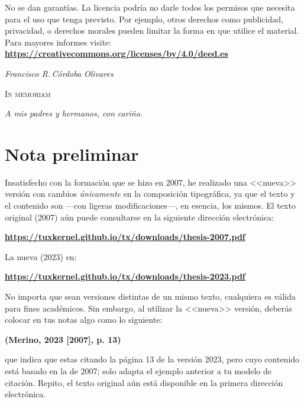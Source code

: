 \documentclass[14pt,twoside,final]{extbook} %
\begin{document}
\begin{scriptsize}
\begin{flushleft}
\begin{minipage}{7.5cm}
\noindent No se dan garantías. La licencia podría no darle todos los permisos que necesita para el uso que tenga previsto. Por ejemplo, otros derechos como publicidad, privacidad, o derechos morales pueden limitar la forma en que utilice el material. \\

\noindent Para mayores informes visite: \\ 

\textbf{\url{https://creativecommons.org/licenses/by/4.0/deed.es}}
\end{minipage}
\end{flushleft}
\end{scriptsize}
\newpage
\pagestyle{empty}
\vspace*{42pt}
\begin{flushright}
\textit{Francisco R.\,Córdoba Olivares}
\end{flushright}
\begin{flushright}
\textsc{In memoriam}
\vspace*{28pt}
\end{flushright}
\begin{flushright}
\textit{A mis padres y hermanos, con cariño.}
\end{flushright}
\newpage
\pagestyle{empty}
\newpage
\pagestyle{empty}
\chapter*{Nota preliminar}\label{ch:nota-preliminar}
Insatisfecho con la formación que se hizo en 2007, he realizado una <<nueva>> versión con cambios \emph{únicamente} en la composición tipográfica, ya que el texto y el contenido son ---con ligeras modificaciones---, en esencia, los mismos. El texto original (2007) aún puede consultarse en la siguiente dirección electrónica:
\begin{center}
\href{https://tuxkernel.github.io/tx/downloads/thesis-2007.pdf}{\bfseries https://tuxkernel.github.io/tx/downloads/thesis-2007.pdf}
\end{center}
La nueva (2023) en:
\begin{center}
\href{https://tuxkernel.github.io/tx/downloads/thesis-2023.pdf}{\bfseries https://tuxkernel.github.io/tx/downloads/thesis-2023.pdf}
\end{center}
No importa que sean versiones distintas de un mismo texto, cualquiera es válida para fines académicos. Sin embargo, al utilizar la <<nueva>> versión, deberás colocar en tus notas algo como lo siguiente:
\begin{center}
\bfseries (Merino, 2023 [2007], p. 13)
\end{center}
\noindent que indica que estas citando la página 13 de la versión 2023, pero cuyo contenido está basado en la de 2007; solo adapta el ejemplo anterior a tu modelo de citación. Repito, el texto original aún está disponible en la primera dirección electrónica.
\end{document}
